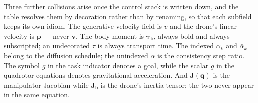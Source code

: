 \documentclass[headsepline,footsepline,footinclude=false,oneside,fontsize=11pt,paper=a4,listof=totoc,bibliography=totoc]{scrbook}
\theoremstyle{definition}
\theoremstyle{plain}
\theoremstyle{remark}
\newcommand{\vect}[1]{\boldsymbol{#1}}
\newcommand{\matr}[1]{\boldsymbol{#1}}
\newcommand{\sidx}[1]{_{\textrm{#1}}}
\newcommand{\vfield}{v}                        %
\begin{document}
Three further collisions arise once the control stack is written down, and the table resolves them
by decoration rather than by renaming, so that each subfield keeps its own idiom. The generative
velocity field is $\vfield$ and the drone's linear velocity is $\dot{\vect{p}}$ --- never $\vect{v}$.
The body moment is $\vect{\tau}\sidx{b}$, always bold and always subscripted; an undecorated $\tau$
is always transport time. The indexed $\alpha_k$ and $\bar{\alpha}_k$ belong to the diffusion
schedule; the unindexed $\alpha$ is the consistency step ratio. The symbol $g$ in the task indicator
denotes a goal, while the scalar $g$ in the quadrotor equations denotes gravitational acceleration.
And $\matr{J}(\vect{q})$ is the manipulator Jacobian while
$\matr{J}\sidx{b}$ is the drone's inertia tensor; the two never appear in the same equation.
\end{document}
